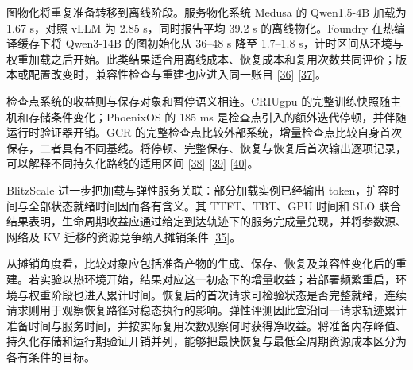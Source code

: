 \documentclass[UTF8,10.5pt,fontset=windows]{ctexart}
\begin{document}
图物化将重复准备转移到离线阶段。服务物化系统 Medusa 的 Qwen1.5-4B 加载为
1.67 s，对照 vLLM 为 2.85 s，同时报告平均 39.2 s 的离线物化。Foundry
在热编译缓存下将 Qwen3-14B 的图初始化从 36--48 s 降至 1.7--1.8
s，计时区间从环境与权重加载之后开始。此类结果适合用离线成本、恢复成本和复用次数共同评价；版本或配置改变时，兼容性检查与重建也应进入同一账目
{[}\protect\hyperlink{ref-zeng2025medusa}{36}{]}
{[}\protect\hyperlink{ref-liu2026foundry}{37}{]}。

检查点系统的收益则与保存对象和暂停语义相连。CRIUgpu
的完整训练快照随主机和存储条件变化；PhoenixOS 的 185 ms
是检查点引入的额外迭代停顿，并伴随运行时验证器开销。GCR
的完整检查点比较外部系统，增量检查点比较自身首次保存，二者具有不同基线。将停顿、完整保存、恢复与恢复后首次输出逐项记录，可以解释不同持久化路线的适用区间
{[}\protect\hyperlink{ref-stoyanov2025criugpu}{38}{]}
{[}\protect\hyperlink{ref-wei2025phoenixos}{39}{]}
{[}\protect\hyperlink{ref-zeng2026gcr}{40}{]}。

BlitzScale 进一步把加载与弹性服务关联：部分加载实例已经输出
token，扩容时间与全部状态就绪时间因而各有含义。其 TTFT、TBT、GPU 时间和
SLO
联合结果表明，生命周期收益应通过给定到达轨迹下的服务完成量兑现，并将参数源、网络及
KV 迁移的资源竞争纳入摊销条件
{[}\protect\hyperlink{ref-zhang2025blitzscale}{35}{]}。

从摊销角度看，比较对象应包括准备产物的生成、保存、恢复及兼容性变化后的重建。若实验以热环境开始，结果对应这一初态下的增量收益；若部署频繁重启，环境与权重阶段也进入累计时间。恢复后的首次请求可检验状态是否完整就绪，连续请求则用于观察恢复路径对稳态执行的影响。弹性评测因此宜沿同一请求轨迹累计准备时间与服务时间，并按实际复用次数观察何时获得净收益。将准备内存峰值、持久化存储和运行期验证开销并列，能够把最快恢复与最低全周期资源成本区分为各有条件的目标。
\end{document}
